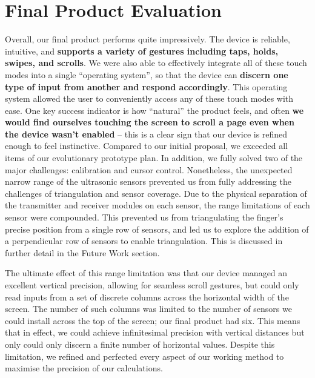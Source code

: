 \documentclass{article}
\begin{document}
\section{Final Product Evaluation}
Overall, our final product performs quite impressively. The device is reliable, intuitive, and \textbf{supports a variety of gestures including taps, holds, swipes, and scrolls}. We were also able to effectively integrate all of these touch modes into a single “operating system”, so that the device can \textbf{discern one type of input from another and respond accordingly}. This operating system allowed the user to conveniently access any of these touch modes with ease. One key success indicator is how “natural” the product feels, and often \textbf{we would find ourselves touching the screen to scroll a page even when the device wasn’t enabled} -- this is a clear sign that our device is refined enough to feel instinctive. Compared to our initial proposal, we exceeded all items of our evolutionary prototype plan. In addition, we fully solved two of the major challenges: calibration and cursor control. Nonetheless, the unexpected narrow range of the ultrasonic sensors prevented us from fully addressing the challenges of triangulation and sensor coverage. Due to the physical separation of the transmitter and receiver modules on each sensor, the range limitations of each sensor were compounded. This prevented us from triangulating the finger’s precise position from a single row of sensors, and led us to explore the addition of a perpendicular row of sensors to enable triangulation. This is discussed in further detail in the Future Work section.

The ultimate effect of this range limitation was that our device managed an excellent vertical precision, allowing for seamless scroll gestures, but could only read inputs from a set of discrete columns across the horizontal width of the screen. The number of such columns was limited to the number of sensors we could install across the top of the screen; our final product had six. This means that in effect, we could achieve infinitesimal precision with vertical distances but only could only discern a finite number of horizontal values. Despite this limitation, we refined and perfected every aspect of our working method to maximise the precision of our calculations.
\end{document}
